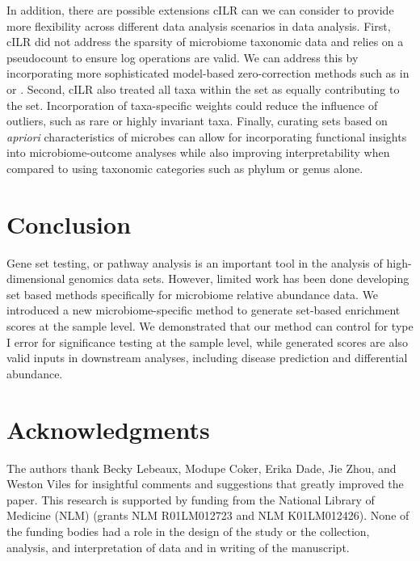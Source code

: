 \documentclass[10pt,letterpaper]{article}
\begin{document}
In addition, there are possible extensions cILR can we can consider to provide more flexibility across different data analysis scenarios in data analysis. First, cILR did not address the sparsity of microbiome taxonomic data and relies on a pseudocount to ensure log operations are valid. We can address this by incorporating more sophisticated model-based zero-correction methods such as in \cite{martin-fernandez2012} or \cite{kaul2017a}. Second, cILR also treated all taxa within the set as equally contributing to the set. Incorporation of taxa-specific weights could reduce the influence of outliers, such as rare or highly invariant taxa. Finally, curating sets based on \emph{apriori} characteristics of microbes can allow for incorporating functional insights into microbiome-outcome analyses while also improving interpretability when compared to using taxonomic categories such as phylum or genus alone.  

\section*{Conclusion}
Gene set testing, or pathway analysis is an important tool in the analysis of high-dimensional genomics data sets. However, limited work has been done developing set based methods specifically for microbiome relative abundance data. We introduced a new microbiome-specific method to generate set-based enrichment scores at the sample level. We demonstrated that our method can control for type I error for significance testing at the sample level, while generated scores are also valid inputs in downstream analyses, including disease prediction and differential abundance.  

\section*{Acknowledgments}
The authors thank Becky Lebeaux, Modupe Coker, Erika Dade, Jie Zhou, and Weston Viles for insightful comments and suggestions that greatly improved the paper. This research is supported by funding from the National Library of Medicine (NLM) (grants NLM R01LM012723 and NLM K01LM012426). None of the funding bodies had a role in the design of the study or the collection, analysis, and interpretation of data and in writing of the manuscript.

\nolinenumbers
%
%
% 
\end{document}
